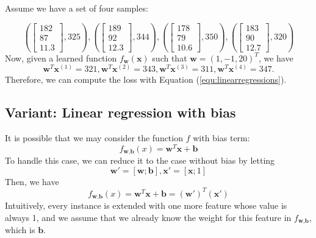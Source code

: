 \begin{example}\label{example:linearregression}
Assume we have a set of four samples: 

\begin{equation}
(\begin{bmatrix}
182 \\
87\\
11.3
\end{bmatrix},325), 
(\begin{bmatrix}
189 \\
92\\
12.3
\end{bmatrix},344),
(\begin{bmatrix}
178 \\
79\\
10.6
\end{bmatrix},350),
(\begin{bmatrix}
183 \\
90\\
12.7
\end{bmatrix},320)
\end{equation}
Now, given a learned function $f_{\textbf{w}}(\textbf{x})$ such that $\textbf{w}=(1,-1,20)^T$, we have 
\begin{equation}
    \textbf{w}^T\textbf{x}^{(1)}=321, \textbf{w}^T\textbf{x}^{(2)}=343,
    \textbf{w}^T\textbf{x}^{(3)}=311,
    \textbf{w}^T\textbf{x}^{(4)}=347. 
\end{equation}
Therefore, we can compute the loss with Equation (\ref{equ:linearregressions}).
\end{example}

\subsection*{Variant: Linear regression with bias} It is possible that we may consider the function $f$ with bias term: 
\begin{equation}
    f_{\textbf{w,b}}(x)= \textbf{w}^T\textbf{x} + \textbf{b}
\end{equation}
To handle this case, we can reduce it to the case without bias by letting 
\begin{equation}
    \textbf{w}' = [\textbf{w};\textbf{b}], \textbf{x}'=[\textbf{x};1]
\end{equation}
Then, we have 
\begin{equation}
    f_{\textbf{w,b}}(x)= \textbf{w}^T\textbf{x} + \textbf{b} = (\textbf{w}')^T(\textbf{x}')
\end{equation}
Intuitively, every instance is extended with one more feature whose value is always 1, and we assume that we already know the weight for this feature in $f_{\textbf{w,b}}$, which is $\textbf{b}$. 

